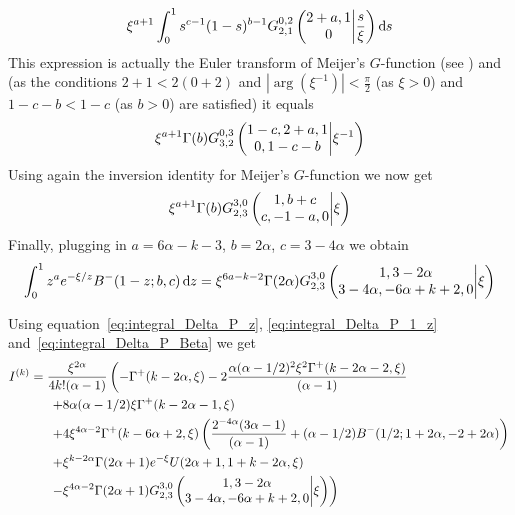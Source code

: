 \begin{align*}
	\xi^{a+1} \int_0^1 s^{c-1} (1-s)^{b-1} \MeijerG{0}{2}{2}{1}{2+a,1}{0}{\frac{s}{\xi}} \dd s
\end{align*}
This expression is actually the Euler transform of Meijer's $G$-function (see \cite[p. 214, 5.5.2.(5)]{erdelyi1953higher}) and (as the conditions $2+1<2(0+2)$ and $|\arg(\xi^{-1})| < \frac{\pi}{2}$ (as $\xi>0$) and $1-c-b<1-c$ (as $b>0$)  are satisfied) it equals
\begin{align*}
	\xi^{a+1} \Gamma(b) \MeijerG{0}{3}{3}{2}{1-c,2+a,1}{0,1-c-b}{\xi^{-1}}
\end{align*}
Using again the inversion identity for Meijer's $G$-function we now get
\begin{align*}
	\xi^{a+1} \Gamma(b) \MeijerG{3}{0}{2}{3}{1,b+c}{c,-1-a,0}{\xi}
\end{align*}
Finally, plugging in $a= 6\alpha-k-3$, $b=2\alpha$, $c=3-4\alpha$ we obtain
\begin{equation}\label{eq:integral_Delta_P_Beta}
	\int_0^1 z^a e^{-\xi/z} B^-(1-z;b,c) \dd z =
	\xi^{6a-k-2} \Gamma(2\alpha) \MeijerG{3}{0}{2}{3}{1,3-2\alpha}{3-4\alpha,-6\alpha+k+2,0}{\xi}
\end{equation}


Using equation~\eqref{eq:integral_Delta_P_z}, \eqref{eq:integral_Delta_P_1_z} and~\eqref{eq:integral_Delta_P_Beta} we get
\begin{align*}
	I^{(k)}
	&=\frac{\xi^{2\alpha}}{4k!(\alpha-1)} \left( -\Gamma^+(k - 2 \alpha, \xi) 
		- 2\frac{\alpha (\alpha - 1/2)^2 \xi^{2} \Gamma^+(k - 2 \alpha - 2, \xi)}{(\alpha - 1)} \right. \\ 
	&\hspace{15pt}\left.+ 8 \alpha (\alpha - 1/2) \xi \Gamma^+(k - 2 \alpha - 1,\xi) \right.\\ 
	&\hspace{15pt}\left.+ 4\xi^{4\alpha - 2} 
		\Gamma^+(k - 6 \alpha + 2, \xi) \left( 
		\frac{2^{ - 4\alpha}(3 \alpha - 1)}{(\alpha - 1)} + (\alpha - 1/2) B^-(1/2; 1 + 2 \alpha, -2 + 2 \alpha) \right)  \right.\\ 
	&\hspace{15pt}\left.+ \xi^{k-2\alpha} \Gamma(2\alpha+1)e^{-\xi} 	
		U(2\alpha+1,1+k-2\alpha,\xi) \right. \\ 
	&\hspace{15pt}\left.- \xi^{4\alpha-2} 
		\Gamma(2\alpha+1)\MeijerG{3}{0}{2}{3}{1,3-2\alpha}{3-4\alpha,-6\alpha+k+2,0}{\xi}  \right)\\
\end{align*}%

